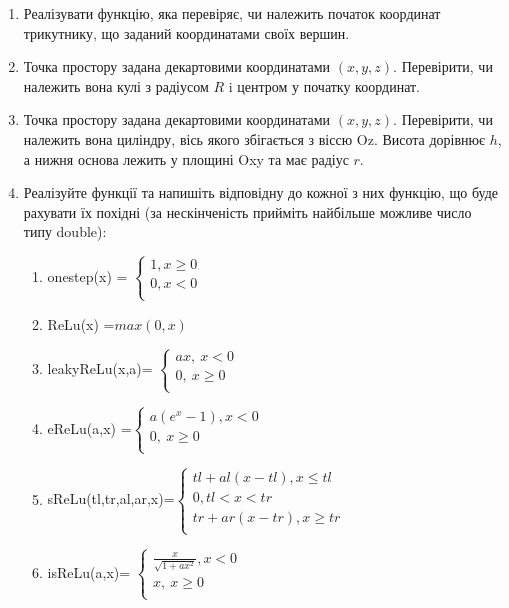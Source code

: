 \documentclass[]{article}
\makeatletter
\newcommand{\xslalph}[1]{\expandafter\@xslalph\csname c@#1\endcsname}
\newcommand{\@xslalph}[1]{%
    \ifcase#1\or а\or б\or в\or г\or д\or e\or є\or ж\or з\or i%
    \or й\or к\or л\or м\or н\or о\or п\or р\or с\or т%
    \or у\or ф\or х\or ц\or ч\or ш\or ю\or я\or аа\or бб\or вв %
    \else\@ctrerr\fi%
}
\makeatother
\begin{document}
\begin{enumerate}
\item
  Реалізувати функцію, яка перевіряє, чи належить початок координат
  трикутнику, що заданий координатами своїх вершин.
\item
  Точка простору задана декартовими координатами $(x, y, z)$. Перевірити,
  чи належить вона кулі з радіусом $R$ i центром у початку координат.
\item
  Точка простору задана декартовими координатами $(x, y, z)$. Перевірити,
  чи належить вона циліндру, вісь якого збігається з віссю Oz. Висота
  дорівнює $h$, а нижня основа лежить у площині Oxy та має радіус $r$.
\item
  Реалізуйте функції та напишіть відповідну до кожної з них функцію, що
  буде рахувати їх похідні (за нескінченість прийміть найбільше можливе 
число типу double):
\begin{enumerate}[label=\xslalph*)]
\item onestep(x) = \(\left\{ \begin{matrix}
1,x \geq 0 \\
0,x < 0 \\
\end{matrix} \right.\ \)

\item 
ReLu(x) =\(max(0,x)\)

\item
leakyReLu(x,a)= \(\left\{ \begin{matrix}
ax,\ x < 0 \\
0,\ x \geq 0 \\
\end{matrix} \right.\ \)

\item 
eReLu(a,x) =\(\left\{ \begin{matrix}
a(e^{x} - 1),x < 0 \\
0,\ x \geq 0 \\
\end{matrix} \right.\ \)

\item 
sReLu(tl,tr,al,ar,x)=\(\left\{ \begin{matrix}
tl + al\left( x - tl \right),x \leq tl \\
0,tl < x < tr \\
tr + ar\left( x - tr \right),x \geq tr \\
\end{matrix} \right.\ \)

\item
 isReLu(a,x)= \(\left\{ \begin{matrix}
\frac{x}{\sqrt{1 + ax^{2}}},x < 0 \\
x,\ x \geq 0 \\
\end{matrix} \right.\ \)


\end{enumerate}
\end{enumerate}
\end{document}
